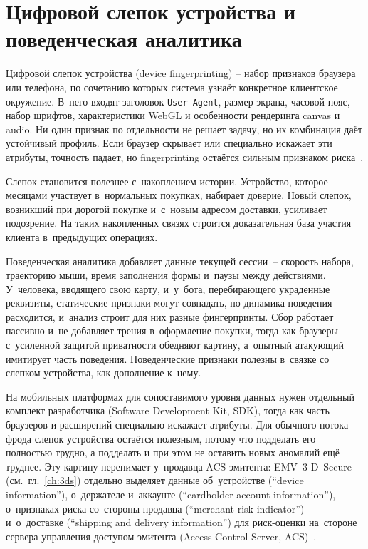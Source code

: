 \section{Цифровой слепок устройства и поведенческая аналитика}\label{sec:fraud-fingerprint}

Цифровой слепок устройства (device fingerprinting) -- набор признаков
браузера или телефона, по сочетанию которых система узнаёт конкретное
клиентское окружение. В~него входят заголовок \texttt{User-Agent},
размер экрана, часовой пояс, набор шрифтов, характеристики WebGL
и особенности рендеринга canvas и audio. Ни один признак по отдельности
не решает задачу, но их комбинация даёт устойчивый профиль. Если
браузер скрывает или специально искажает эти атрибуты, точность падает,
но fingerprinting остаётся сильным признаком
риска~\cite{eckersley-fingerprinting-2010}.

Слепок становится полезнее с~накоплением истории. Устройство,
которое месяцами участвует в~нормальных покупках, набирает доверие.
Новый слепок, возникший при дорогой покупке и~с~новым
адресом доставки, усиливает подозрение. На таких накопленных связях
строится доказательная база участия клиента в~предыдущих
операциях.

Поведенческая аналитика добавляет данные текущей сессии~-- скорость
набора, траекторию мыши, время заполнения формы и~паузы между
действиями. У~человека, вводящего свою карту, и~у~бота, перебирающего
украденные реквизиты, статические признаки могут совпадать, но динамика поведения
расходится, и~анализ строит для них разные фингерпринты. Сбор работает пассивно
и~не добавляет трения в~оформление покупки, тогда как браузеры
с~усиленной защитой приватности обедняют картину, а~опытный атакующий
имитирует часть поведения. Поведенческие признаки полезны в~связке
со слепком устройства, как дополнение к~нему.

На мобильных платформах для сопоставимого уровня данных нужен
отдельный комплект разработчика (Software Development Kit, SDK),
тогда как часть браузеров и расширений специально
искажает атрибуты. Для обычного потока фрода слепок устройства
остаётся полезным, потому что подделать его полностью трудно,
а подделать и при этом не оставить новых аномалий ещё труднее.
Эту картину перенимает у~продавца ACS эмитента: EMV~3-D~Secure
(см.~гл.~\ref{ch:3ds}) отдельно выделяет данные об~устройстве
(\enquote{device information}), о~держателе и~аккаунте
(\enquote{cardholder account information}), о~признаках риска
со~стороны продавца (\enquote{merchant risk indicator})
и~о~доставке (\enquote{shipping and delivery information})
для риск-оценки на~стороне сервера управления доступом эмитента
(Access Control Server, ACS)~\cite{emvco-3ds-tech-features}.

